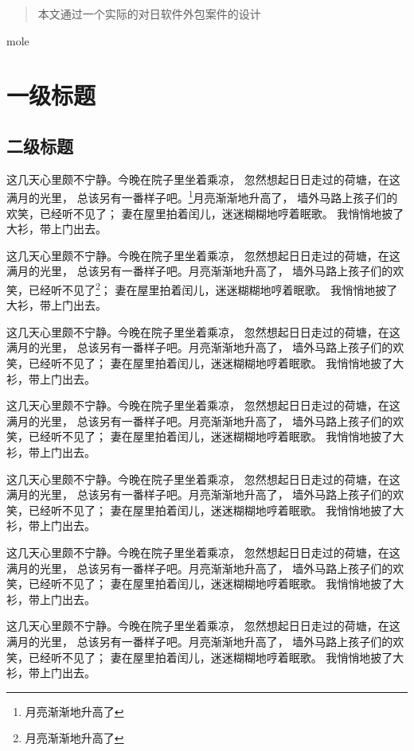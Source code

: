 \documentclass[printMode]{ecnuthesis}
\begin{document}
\tableofcontents

\begin{abstract}
  本文通过一个实际的对日软件外包案件的设计
\end{abstract}

\begin{abstractEN}
  mole
\end{abstractEN}

\chapter{一级标题}

\section{二级标题}

这几天心里颇不宁静。今晚在院子里坐着乘凉，
忽然想起日日走过的荷塘，在这满月的光里，
总该另有一番样子吧。\footnote{月亮渐渐地升高了}月亮渐渐地升高了，
墙外马路上孩子们的欢笑，已经听不见了；
妻在屋里拍着闰儿，迷迷糊糊地哼着眠歌。
我悄悄地披了大衫，带上门出去。

这几天心里颇不宁静。今晚在院子里坐着乘凉，
忽然想起日日走过的荷塘，在这满月的光里，
总该另有一番样子吧。月亮渐渐地升高了，
墙外马路上孩子们的欢笑，已经听不见了\footnote{月亮渐渐地升高了}；
妻在屋里拍着闰儿，迷迷糊糊地哼着眠歌。
我悄悄地披了大衫，带上门出去。

这几天心里颇不宁静。今晚在院子里坐着乘凉，
忽然想起日日走过的荷塘，在这满月的光里，
总该另有一番样子吧。月亮渐渐地升高了，
墙外马路上孩子们的欢笑，已经听不见了；
妻在屋里拍着闰儿，迷迷糊糊地哼着眠歌。
我悄悄地披了大衫，带上门出去。

这几天心里颇不宁静。今晚在院子里坐着乘凉，
忽然想起日日走过的荷塘，在这满月的光里，
总该另有一番样子吧。月亮渐渐地升高了，
墙外马路上孩子们的欢笑，已经听不见了；
妻在屋里拍着闰儿，迷迷糊糊地哼着眠歌。
我悄悄地披了大衫，带上门出去。

这几天心里颇不宁静。今晚在院子里坐着乘凉，
忽然想起日日走过的荷塘，在这满月的光里，
总该另有一番样子吧。月亮渐渐地升高了，
墙外马路上孩子们的欢笑，已经听不见了；
妻在屋里拍着闰儿，迷迷糊糊地哼着眠歌。
我悄悄地披了大衫，带上门出去。

这几天心里颇不宁静。今晚在院子里坐着乘凉，
忽然想起日日走过的荷塘，在这满月的光里，
总该另有一番样子吧。月亮渐渐地升高了，
墙外马路上孩子们的欢笑，已经听不见了；
妻在屋里拍着闰儿，迷迷糊糊地哼着眠歌。
我悄悄地披了大衫，带上门出去。

这几天心里颇不宁静。今晚在院子里坐着乘凉，
忽然想起日日走过的荷塘，在这满月的光里，
总该另有一番样子吧。月亮渐渐地升高了，
墙外马路上孩子们的欢笑，已经听不见了；
妻在屋里拍着闰儿，迷迷糊糊地哼着眠歌。
我悄悄地披了大衫，带上门出去。
\end{document}
